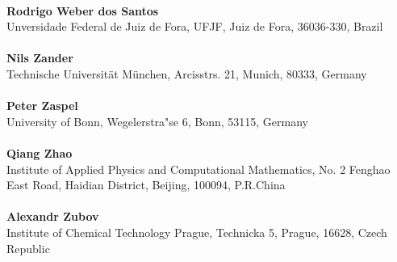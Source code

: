 \\ 
\textbf{Rodrigo Weber dos Santos}
\\ 
Unversidade Federal de Juiz de Fora, UFJF, Juiz de Fora, 36036-330, Brazil\\ 
\\ 
\textbf{Nils Zander}
\\ 
Technische Universit\"at M\"unchen, Arcisstrs. 21, Munich, 80333, Germany\\ 
\\ 
\textbf{Peter Zaspel}
\\ 
University of Bonn, Wegelerstra"se 6, Bonn, 53115, Germany\\ 
\\ 
\textbf{Qiang Zhao}
\\ 
Institute of Applied Physics and Computational Mathematics, No. 2 Fenghao East Road, Haidian District, Beijing, 100094, P.R.China\\ 
\\ 
\textbf{Alexandr Zubov}
\\ 
Institute of Chemical Technology Prague, Technicka 5, Prague, 16628, Czech Republic
